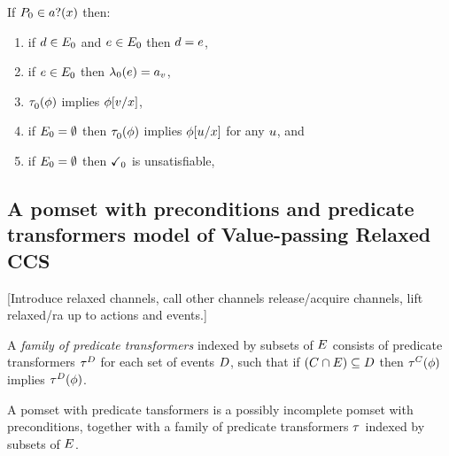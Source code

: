 \begin{definition}
  If $\aPS_0 \in \sRECV\aChan{\aVar}$ then:
  \begin{enumerate}
  \item if $\bEv\in\aEvs_0$ and $\aEv\in\aEvs_0$ then $\bEv=\aEv$,
  \item if $\aEv\in\aEvs_0$ then $\labeling_0(\aEv) = \recv\aChan{\aVal}$,
  \item $\aTr_0(\aForm)$ implies $\phi[\aVal/\aVar]$,
  \item if $\aEvs_0=\emptyset$ then $\aTr_0(\aForm)$ implies $\phi[\bVal/\aVar]$ for any $\bVal$, and
  \item if $\aEvs_0=\emptyset$ then $\complete_0$ is unsatisfiable,
  \end{enumerate}
\end{definition}

\subsection{A pomset with preconditions and predicate transformers model of Value-passing Relaxed CCS}

[Introduce relaxed channels, call other channels release/acquire channels, lift relaxed/ra up to actions and events.]

\begin{definition}
  A \emph{family of predicate transformers}
  indexed by subsets of $\aEvs$
  consists of predicate transformers
  $\aTr[\bEvs]$ for each set of events $\bEvs$,
  such that if $(\cEvs\cap\aEvs) \subseteq \bEvs$
  then $\aTr[\cEvs](\aForm)$ implies $\aTr[\bEvs](\aForm)$.
\end{definition}

\begin{definition}
  A pomset with predicate tansformers is a possibly incomplete
  pomset with preconditions, together with a family of predicate transformers $\aTr$
  indexed by subsets of $\aEvs$.
\end{definition}

